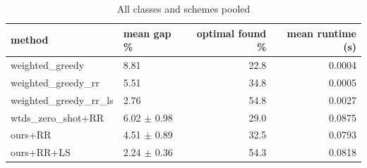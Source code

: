 \begin{table}[t]
\centering
\small
\caption{All classes and schemes pooled}
\begin{tabular}{llrr}
\toprule
method & mean gap \% & optimal found \% & mean runtime (s) \\
\midrule
weighted\_greedy & 8.81 & 22.8 & 0.0004 \\
weighted\_greedy\_rr & 5.51 & 34.8 & 0.0005 \\
weighted\_greedy\_rr\_ls & 2.76 & 54.8 & 0.0027 \\
wtds\_zero\_shot+RR & 6.02 $\pm$ 0.98 & 29.0 & 0.0875 \\
ours+RR & 4.51 $\pm$ 0.89 & 32.5 & 0.0793 \\
ours+RR+LS & 2.24 $\pm$ 0.36 & 54.3 & 0.0818 \\
\bottomrule
\end{tabular}
\end{table}
